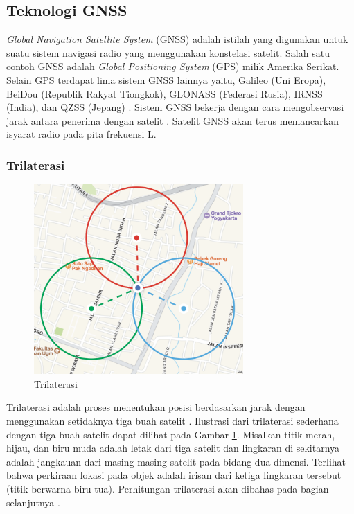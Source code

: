 \subsection{Teknologi GNSS}
\textit{Global Navigation Satellite System} (GNSS) adalah istilah yang digunakan untuk suatu sistem navigasi radio yang menggunakan konstelasi satelit. Salah satu contoh GNSS adalah \textit{Global Positioning System} (GPS) milik Amerika Serikat. Selain GPS terdapat lima sistem GNSS lainnya yaitu, Galileo (Uni Eropa), BeiDou (Republik Rakyat Tiongkok), GLONASS (Federasi Rusia), IRNSS (India), dan QZSS (Jepang) \cite{NationalCoordinationOfficeforSpace-BasedPositioning2021}. Sistem GNSS bekerja dengan cara mengobservasi jarak antara penerima dengan satelit \cite{TheEuropeanGlobalNavigationSatelliteSystemsAgency2021}. Satelit GNSS akan terus memancarkan isyarat radio pada pita frekuensi L.

\subsubsection{Trilaterasi}
\begin{figure}[ht]
	\centering
	\includegraphics[width=8cm]{contents/chapter-2/trilaterasi.png}
	\caption{Trilaterasi}
	\label{Fig: Trilaterasi}
\end{figure}
Trilaterasi adalah proses menentukan posisi berdasarkan jarak dengan menggunakan setidaknya tiga buah satelit \cite{AmericanSocietyofCivilEngineers1994}. Ilustrasi dari trilaterasi sederhana dengan tiga buah satelit dapat dilihat pada Gambar \ref{Fig: Trilaterasi}. Misalkan titik merah, hijau, dan biru muda adalah letak dari tiga satelit dan lingkaran di sekitarnya adalah jangkauan dari masing-masing satelit pada bidang dua dimensi. Terlihat bahwa perkiraan lokasi pada objek adalah irisan dari ketiga lingkaran tersebut (titik berwarna biru tua). Perhitungan trilaterasi akan dibahas pada bagian selanjutnya \cite{Seo2012}.

